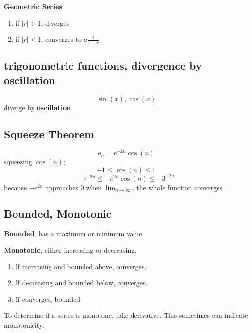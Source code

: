 \hfill
\hfill


\textbf{Geometric Series}



\begin{enumerate}
	\item if $|r|>1$, diverges
	\item if $|r|<1$, converges to $a\frac{1}{1-r}$
\end{enumerate}

\subsection{trigonometric functions, divergence by oscillation}
\begin{equation}
	\label{}
	\sin(x),\cos(x)
\end{equation}
diverge by \textbf{oscillation}

\subsection{Squeeze Theorem}
\begin{equation}
	\label{}
a_{n}=e^{-2n}\cos(n)
\end{equation}
squeezing $\cos(n)$;
\begin{equation}
	\label{}
-1\leq \cos(n) \leq 1	
\end{equation}
\begin{equation}
	\label{}
-e^{-2n}\leq -e^{2n}\cos(n) \leq -3^{-2n}	
\end{equation}
because $-e^{2n}$ approaches 0 when  $\lim_{n\to\infty}$, the whole function converges

\subsection{Bounded, Monotonic}
\textbf{Bounded}, has a maximum or minimum value

\textbf{Monotonic}, either increasing or decreasing.

\begin{enumerate}	
	\item If increasing and bounded above, converges.

\item If decreasing and bounded below, converges.

\item If converges, bounded
\end{enumerate}

To determine if a series is monotone, take derivative. This sometimes can indicate monotonicity.


